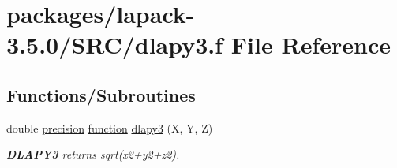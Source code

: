 \hypertarget{dlapy3_8f}{}\section{packages/lapack-\/3.5.0/\+S\+R\+C/dlapy3.f File Reference}
\label{dlapy3_8f}
\subsection*{Functions/\+Subroutines}
\begin{DoxyCompactItemize}
\item 
double \hyperlink{numinquire_8h_a2c8e616467665d0b2814d4c1589ba74e}{precision} \hyperlink{afunc_8m_a7b5e596df91eadea6c537c0825e894a7}{function} \hyperlink{group__auxOTHERauxiliary_gad929930f6e7780e8a1d73b2515ddd42b}{dlapy3} (X, Y, Z)
\begin{DoxyCompactList}\small\item\em {\bfseries D\+L\+A\+P\+Y3} returns sqrt(x2+y2+z2). \end{DoxyCompactList}\end{DoxyCompactItemize}
